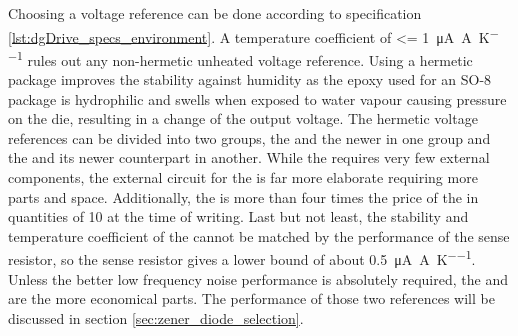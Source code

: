 Choosing a voltage reference can be done according to specification \ref{lst:dgDrive_specs_environment}. A temperature coefficient of \qty{<= 1}{\uA \per \A \per \K} rules out any non-hermetic unheated voltage reference. Using a hermetic package improves the stability against humidity as the epoxy used for an SO-8 package is hydrophilic and swells when exposed to water vapour causing pressure on the die, resulting in a change of the output voltage. The hermetic voltage references can be divided into two groups, the  and the newer  in one group and the  and its newer counterpart  in another. While the  requires very few external components, the external circuit for the  is far more elaborate requiring more parts and space. Additionally, the  is more than four times the price of the  in quantities of \num{10} at the time of writing. Last but not least, the stability and temperature coefficient of the  cannot be matched by the performance of the sense resistor, so the sense resistor gives a lower bound of about \qty{0.5}{\uA \per \A \per \K}. Unless the better low frequency noise performance is absolutely required, the  and  are the more economical parts. The performance of those two references will be discussed in section \ref{sec:zener_diode_selection}.

